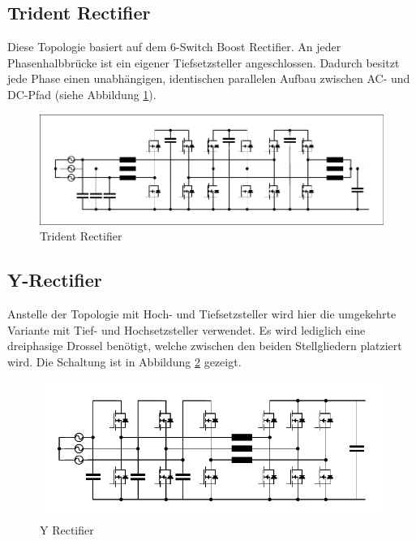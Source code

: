 	\subsection{Trident Rectifier}
		Diese Topologie basiert auf dem 6-Switch Boost Rectifier. An jeder Phasenhalbbrücke ist ein eigener Tiefsetzsteller angeschlossen. Dadurch besitzt jede Phase einen unabhängigen, identischen parallelen Aufbau zwischen AC- und DC-Pfad (siehe Abbildung \ref{fig:trident}). 
		\begin{figure}[H]
			\centering
			\includegraphics[width=0.9\linewidth]{content/Grafiken/Trident}
			\caption{Trident Rectifier}
			\label{fig:trident}
		\end{figure}
		
	\subsection{Y-Rectifier}
		Anstelle der Topologie mit Hoch- und Tiefsetzsteller wird hier die umgekehrte Variante mit Tief- und Hochsetzsteller verwendet. Es wird lediglich eine dreiphasige Drossel benötigt, welche zwischen den beiden Stellgliedern platziert wird. Die Schaltung ist in Abbildung \ref{fig:y-rectifier} gezeigt.
		
	
		\begin{figure}[H]
			\centering
			\includegraphics[width=0.9\linewidth]{content/Grafiken/Y-Rectifier}
			\caption{Y Rectifier}
			\label{fig:y-rectifier}
		\end{figure}
	
